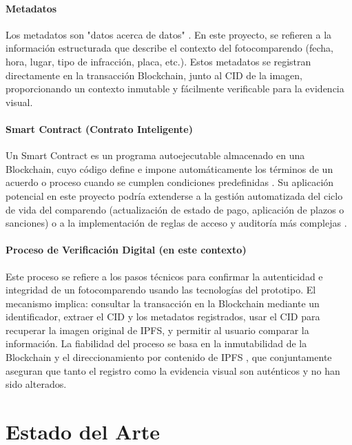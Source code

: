 \documentclass[
    letterpaper, 
    man,   
    spanish,
    12pt,
    donotrepeattitle,
    floatsintext,
    hidelinks %
]{apa7}
\renewcommand{\large}{\fontsize{14.4}{18}\selectfont}
\begin{document}
\paragraph{Metadatos}  

Los metadatos son "datos acerca de datos" \parencite{gilliland2008setting}. En este proyecto, se refieren a la información estructurada que describe el contexto del fotocomparendo (fecha, hora, lugar, tipo de infracción, placa, etc.). Estos metadatos se registran directamente en la transacción Blockchain, junto al CID de la imagen, proporcionando un contexto inmutable y fácilmente verificable para la evidencia visual. 

\paragraph{Smart Contract (Contrato Inteligente)} 

Un Smart Contract es un programa autoejecutable almacenado en una Blockchain, cuyo código define e impone automáticamente los términos de un acuerdo o proceso cuando se cumplen condiciones predefinidas \parencite{szabo1997smart, wood2014ethereum}. Su aplicación potencial en este proyecto podría extenderse a la gestión automatizada del ciclo de vida del comparendo (actualización de estado de pago, aplicación de plazos o sanciones) o a la implementación de reglas de acceso y auditoría más complejas \parencite{buterin2014next}. 

\paragraph{Proceso de Verificación Digital (en este contexto)}  

Este proceso se refiere a los pasos técnicos para confirmar la autenticidad e integridad de un fotocomparendo usando las tecnologías del prototipo. El mecanismo implica: consultar la transacción en la Blockchain mediante un identificador, extraer el CID y los metadatos registrados, usar el CID para recuperar la imagen original de IPFS, y permitir al usuario comparar la información. La fiabilidad del proceso se basa en la inmutabilidad de la Blockchain \parencite{nakamoto2008bitcoin} y el direccionamiento por contenido de IPFS \parencite{benet2014ipfs}, que conjuntamente aseguran que tanto el registro como la evidencia visual son auténticos y no han sido alterados. 

\section{\large Estado del Arte}  
\end{document}
